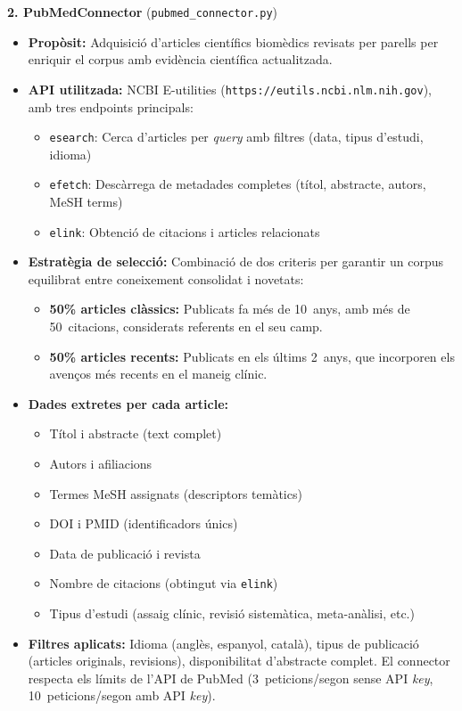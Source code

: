 \documentclass[CAT]{TFUOC}%
\begin{document}
\textbf{2. PubMedConnector} (\texttt{pubmed\_connector.py})

\begin{itemize}
    \item \textbf{Propòsit:} Adquisició d'articles científics biomèdics revisats per parells per enriquir el corpus amb evidència científica actualitzada.
    
    \item \textbf{API utilitzada:} NCBI E-utilities (\texttt{https://eutils.ncbi.nlm.nih.gov}), amb tres endpoints principals:
    \begin{itemize}
        \item \texttt{esearch}: Cerca d'articles per \textit{query} amb filtres (data, tipus d'estudi, idioma)
        \item \texttt{efetch}: Descàrrega de metadades completes (títol, abstracte, autors, MeSH terms)
        \item \texttt{elink}: Obtenció de citacions i articles relacionats
    \end{itemize}
    
    \item \textbf{Estratègia de selecció:} Combinació de dos criteris per garantir un corpus equilibrat entre coneixement consolidat i novetats:
    \begin{itemize}
        \item \textbf{50\% articles clàssics:} Publicats fa més de 10~anys, amb més de 50~citacions, considerats referents en el seu camp.
        \item \textbf{50\% articles recents:} Publicats en els últims 2~anys, que incorporen els avenços més recents en el maneig clínic.
    \end{itemize}
    
    \item \textbf{Dades extretes per cada article:}
    \begin{itemize}
        \item Títol i abstracte (text complet)
        \item Autors i afiliacions
        \item Termes MeSH assignats (descriptors temàtics)
        \item DOI i PMID (identificadors únics)
        \item Data de publicació i revista
        \item Nombre de citacions (obtingut via \texttt{elink})
        \item Tipus d'estudi (assaig clínic, revisió sistemàtica, meta-anàlisi, etc.)
    \end{itemize}
    
    \item \textbf{Filtres aplicats:} Idioma (anglès, espanyol, català), tipus de publicació (articles originals, revisions), disponibilitat d'abstracte complet. El connector respecta els límits de l'API de PubMed (3~peticions/segon sense API \textit{key}, 10~peticions/segon amb API \textit{key}).
\end{itemize}
\end{document}
